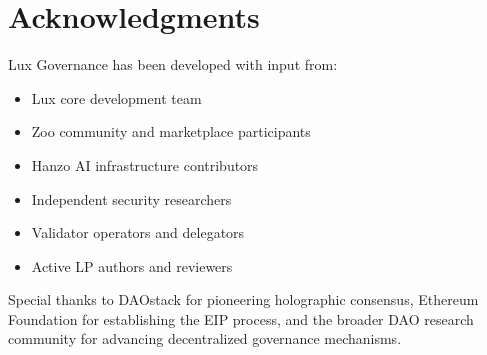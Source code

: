 \section*{Acknowledgments}


Lux Governance has been developed with input from:
\begin{itemize}
\item Lux core development team
\item Zoo community and marketplace participants
\item Hanzo AI infrastructure contributors
\item Independent security researchers
\item Validator operators and delegators
\item Active LP authors and reviewers
\end{itemize}

Special thanks to DAOstack for pioneering holographic consensus, Ethereum Foundation for establishing the EIP process, and the broader DAO research community for advancing decentralized governance mechanisms.

